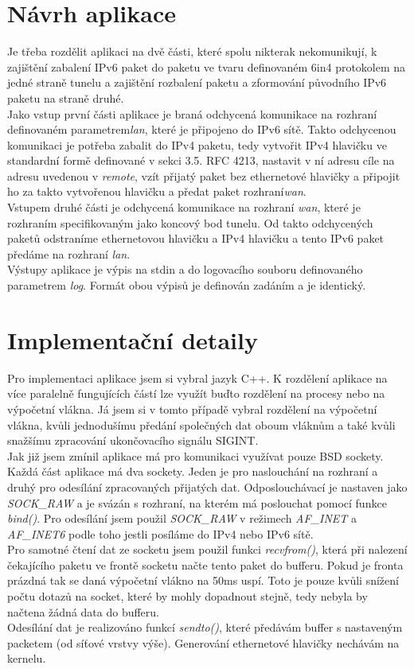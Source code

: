 \documentclass[12pt,a4paper,onecolumn]{article}
\begin{document}
\section{Návrh aplikace}
Je třeba rozdělit aplikaci na dvě části, které spolu nikterak nekomunikují, k zajištění
zabalení IPv6 paket do paketu ve tvaru definovaném 6in4 protokolem na jedné straně tunelu a
zajištění rozbalení paketu a zformování původního IPv6 paketu na straně druhé.\\
\indent Jako vstup první části aplikace je braná odchycená komunikace na rozhraní definovaném
parametrem{\it lan}, které je připojeno do IPv6 sítě. Takto odchycenou komunikaci je potřeba
zabalit do IPv4 paketu, tedy vytvořit IPv4 hlavičku ve standardní formě definované v sekci 3.5.
RFC 4213, nastavit v ní adresu cíle na adresu uvedenou v {\it remote}, vzít přijatý paket bez
ethernetové hlavičky a připojit ho za takto vytvořenou hlavičku a předat paket
rozhraní{\it wan}.\\
\indent Vstupem druhé části je odchycená komunikace na rozhraní {\it wan}, které je rozhraním
specifikovaným jako koncový bod tunelu. Od takto odchycených paketů odstraníme ethernetovou
hlavičku a IPv4 hlavičku a tento IPv6 paket předáme na rozhraní {\it lan}.\\
\indent Výstupy aplikace je výpis na stdin a do logovacího souboru definovaného parametrem
{\it log}. Formát obou výpisů je definován zadáním a je identický.

\section{Implementační detaily}
Pro implementaci aplikace jsem si vybral jazyk C++. K rozdělení aplikace na více paralelně
fungujících částí lze využít buďto rozdělení na procesy nebo na výpočetní vlákna. Já jsem si v
tomto případě vybral rozdělení na výpočetní vlákna, kvůli jednodušímu předání společných dat oboum
vláknům a také kvůli snažšímu zpracování ukončovacího signálu SIGINT.\\
\indent Jak již jsem zmínil aplikace má pro komunikaci využívat pouze BSD sockety. Každá část
aplikace má dva sockety. Jeden je pro naslouchání na rozhraní a druhý pro odesílání zpracovaných
přijatých dat. Odposlouchávací je nastaven jako {\it SOCK\_RAW}  a je svázán s rozhraní, na kterém má poslouchat pomocí funkce {\it bind()}. Pro
odesílání jsem použil {\it SOCK\_RAW} v režimech {\it AF\_INET} a {\it AF\_INET6} podle toho
jestli posíláme do IPv4 nebo IPv6 sítě.\\
\indent Pro samotné čtení dat ze socketu jsem použil funkci {\it recvfrom()}, která při
nalezení čekajícího paketu ve frontě socketu načte tento paket do bufferu. Pokud je fronta prázdná
tak se daná výpočetní vlákno na 50ms uspí. Toto je pouze kvůli snížení počtu dotazů na socket,
které by mohly dopadnout stejně, tedy nebyla by načtena žádná data do bufferu.\\
\indent Odesílání dat je realizováno funkcí {\it sendto()}, které předávám buffer s nastaveným
packetem (od síťové vrstvy výše). Generování ethernetové hlavičky nechávám na kernelu.
\end{document}
